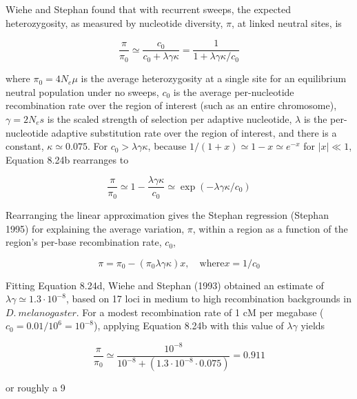\documentclass{article}
\begin{document}
Wiehe and Stephan found that with recurrent sweeps, the expected heterozygosity, as measured by nucleotide diversity,  $ \pi $, at linked neutral sites, is

\begin{equation}
\frac{\pi}{\pi_{0}}\simeq\frac{c_{0}}{c_{0}+\lambda\gamma\kappa}=\frac{1}{1+\lambda\gamma\kappa/c_{0}}
\tag{8.24b}
\label{eq:8_24b}
\end{equation}

where  $ \pi_0 = 4N_e\mu $ is the average heterozygosity at a single site for an equilibrium neutral population under no sweeps,  $ c_0 $ is the average per-nucleotide recombination rate over the region of interest (such as an entire chromosome),  $ \gamma = 2N_e s $ is the scaled strength of selection per adaptive nucleotide,  $ \lambda $ is the per-nucleotide adaptive substitution rate over the region of interest, and there is a constant,  $ \kappa \simeq 0.075 $. For  $ c_0 > \lambda \gamma\kappa $, because  $ 1/(1+x) \simeq 1-x \simeq e^{-x} $ for  $ |x| \ll 1 $, Equation 8.24b rearranges to

\begin{equation}
\frac{\pi}{\pi_{0}}\simeq1-\frac{\lambda\gamma\kappa}{c_{0}}\simeq\exp\left(-\lambda\gamma\kappa/c_{0}\right)
\tag{8.24c}
\label{eq:8_24c}
\end{equation}

Rearranging the linear approximation gives the Stephan regression (Stephan 1995) for explaining the average variation,  $ \pi $, within a region as a function of the region's per-base recombination rate,  $ c_{0} $,

\begin{equation}
\pi=\pi_{0}-\left(\pi_{0}\lambda\gamma\kappa\right)x,\quad\mathrm{w h e r e}x=1/c_{0}
\tag{8.24d}
\label{eq:8_24d}
\end{equation}

Fitting Equation 8.24d, Wiehe and Stephan (1993) obtained an estimate of  $ \lambda \gamma \simeq 1.3 \cdot 10^{-8} $, based on 17 loci in medium to high recombination backgrounds in  $ D.\ melanogaster $. For a modest recombination rate of 1 cM per megabase ( $ c_0 = 0.01/10^6 = 10^{-8} $), applying Equation 8.24b with this value of  $ \lambda \gamma $ yields

\begin{equation}
\frac{\pi}{\pi_{0}}\simeq\frac{10^{-8}}{10^{-8}+(1.3\cdot10^{-8}\cdot0.075)}=0.911
\end{equation}

or roughly a 9%
\end{document}
